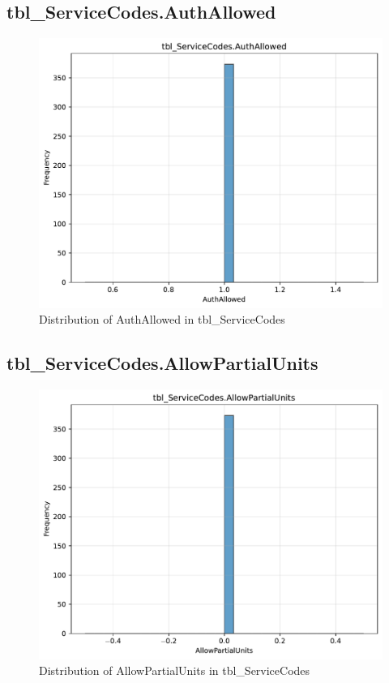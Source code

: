 \subsection{tbl\_ServiceCodes.AuthAllowed}

\begin{figure}[htbp]
\centering
\includegraphics[width=\textwidth]{figures/dbo_tbl_ServiceCodes_AuthAllowed.pdf}
\caption{Distribution of AuthAllowed in tbl\_ServiceCodes}
\end{figure}\newpage

\subsection{tbl\_ServiceCodes.AllowPartialUnits}

\begin{figure}[htbp]
\centering
\includegraphics[width=\textwidth]{figures/dbo_tbl_ServiceCodes_AllowPartialUnits.pdf}
\caption{Distribution of AllowPartialUnits in tbl\_ServiceCodes}
\end{figure}\newpage

